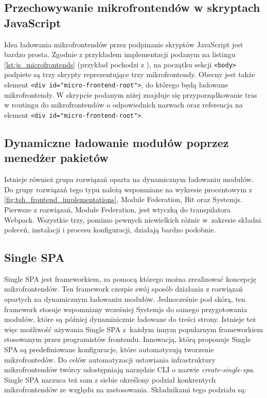 \documentclass{SGGW-thesis}
\begin{document}
{\subsection{Przechowywanie mikrofrontendów w skryptach JavaScript}
Idea ładowania mikrofrontendów przez podpinanie skryptów JavaScript jest bardzo prosta. Zgodnie z przykładem implementacji podanym na listingu \cref{lst:js_microfrontends} (przykład pochodzi z \cite{fowler_2019}), na początku sekcji \lstinline{<body>} podpiete są trzy skrypty reprezentujące trzy mikrofrontendy. Obecny jest także element \lstinline{<div id="micro-frontend-root">}, do którego będą ładowane mikrofrontendy. W skrypcie podanym niżej znajduje się przyporządkowanie tras w routingu do mikrofrontendów o odpowiednich nazwach oraz referencja na element \lstinline{<div id="micro-frontend-root">}.



\subsection{Dynamiczne ładowanie modułów poprzez menedżer pakietów}
Istnieje również grupa rozwiązań oparta na dynamicznym ładowaniu modułów. Do grupy rozwiązań tego typu należą wspomniane na wykresie procentowym z  \cref{fig:tsh_frontend_implementations}, Module Federation, Bit oraz Systemjs. Pierwsze z rozwiązań, Module Federation, jest wtyczką do transpilatora Webpack. Wszystkie trzy, pomimo pewnych niewielkich różnic w~zakresie składni poleceń, instalacji i procesu konfiguracji, działają bardzo podobnie.

\subsection{Single SPA}
Single SPA jest frameworkiem, za pomocą którego można zrealizować koncepcję mikrofrontendów. Ten framework czerpie swój sposób działania z rozwiązań opartych na dynamicznym ładowaniu modułów. Jednocześnie pod skórą, ten framework stosuje wspomniany wcześniej Systemjs do samego przygotowania modułów, które są później dynaminicznie ładowane do treści strony. Istnieje też więc możliwość używania Single SPA z~każdym innym popularnym frameworkiem stosowanym przez programistów frontendu. Innowacją, którą proponuje Single SPA są predefiniowane konfiguracje, które automatyzują tworzenie mikrofrontedów. Do celów automatyzacji ustawiania infrastruktury mikrofrontendów twórcy udostępniają narzędzie CLI o nazwie \textit{create-single-spa}. Single SPA narzuca też sam z siebie określony podział konkrentych mikrofrontendów ze względu na zastosowania. Składnikami tego podziału są:

}
\end{document}
